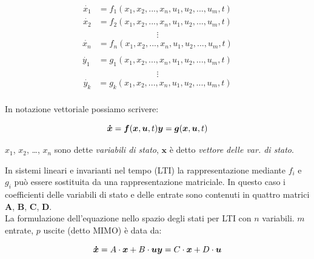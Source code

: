 \documentclass[11pt]{article}
\begin{document}
\begin{align*}
\dot{x_1} &= f_1(x_1, x_2, ..., x_n, u_1, u_2, ..., u_m, t) \\
\dot{x_2} &= f_2(x_1, x_2, ..., x_n, u_1, u_2, ..., u_m, t) \\
\end{align*}
\begin{equation*}
\vdots
\end{equation*}
\begin{align*}
\dot{x_n} &= f_n(x_1, x_2, ..., x_n, u_1, u_2, ..., u_m, t) \\
\quad \\
\dot{y_1} &= g_1(x_1, x_2, ..., x_n, u_1, u_2, ..., u_m, t) \\
\end{align*}
\begin{equation*}
\vdots
\end{equation*}
\begin{align*}
\dot{y_k} &= g_k(x_1, x_2, ..., x_n, u_1, u_2, ..., u_m, t) \\
\end{align*}

    In notazione vettoriale possiamo scrivere:

\begin{equation}
\boldsymbol{\dot{x}} = \boldsymbol{f}(\boldsymbol{x}, \boldsymbol{u}, t) \\
\boldsymbol{y} = \boldsymbol{g}(\boldsymbol{x}, \boldsymbol{u}, t) \\
\end{equation}

    \(x_1\), \(x_2\), \ldots{}, \(x_n\) sono dette \emph{variabili di
stato}, \(\boldsymbol{x}\) è detto \emph{vettore delle var. di stato}.

    In sistemi lineari e invarianti nel tempo (LTI) la rappresentazione
mediante \(f_i\) e \(g_i\) può essere sostituita da una rappresentazione
matriciale. In questo caso i coefficienti delle variabili di stato e
delle entrate sono contenuti in quattro matrici \(\boldsymbol{A}\),
\(\boldsymbol{B}\), \(\boldsymbol{C}\), \(\boldsymbol{D}\).\\
La formulazione dell'equazione nello spazio degli stati per LTI con
\(n\) variabili. \(m\) entrate, \(p\) uscite (detto MIMO) è data da:

\begin{equation}
\boldsymbol{\dot{x}} = A \cdot \boldsymbol{x} + B \cdot \boldsymbol{u}\\
\boldsymbol{y} = C \cdot \boldsymbol{x} + D \cdot \boldsymbol{u} \\
\end{equation}
\end{document}
